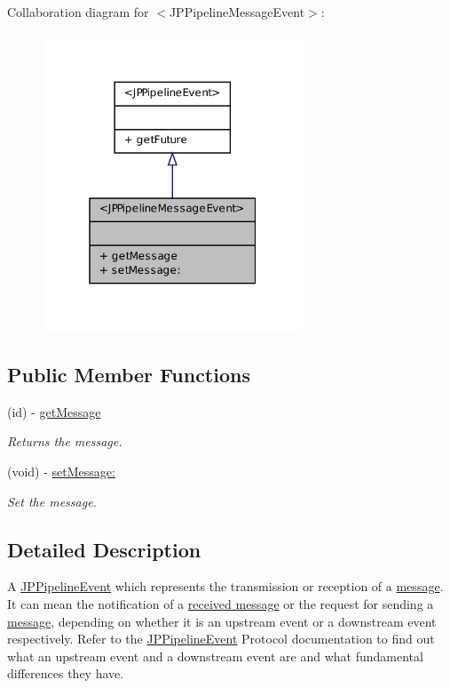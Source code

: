Collaboration diagram for $<$JPPipelineMessageEvent$>$:\nopagebreak
\begin{figure}[H]
\begin{center}
\leavevmode
\includegraphics[width=220pt]{a00144}
\end{center}
\end{figure}
\subsection*{Public Member Functions}
\begin{DoxyCompactItemize}
\item 
\hypertarget{a00031_abbb8960b1919e3c10b28399e6836ed7a}{
(id) -\/ \hyperlink{a00031_abbb8960b1919e3c10b28399e6836ed7a}{getMessage}}
\label{a00031_abbb8960b1919e3c10b28399e6836ed7a}

\begin{DoxyCompactList}\small\item\em Returns the message. \item\end{DoxyCompactList}\item 
(void) -\/ \hyperlink{a00031_acf338a1e97066129630e13538ca904c3}{setMessage:}
\begin{DoxyCompactList}\small\item\em Set the message. \item\end{DoxyCompactList}\end{DoxyCompactItemize}


\subsection{Detailed Description}
A \hyperlink{a00023}{JPPipelineEvent} which represents the transmission or reception of a \hyperlink{a00006}{message}. It can mean the notification of a \hyperlink{a00006}{received message} or the request for sending a \hyperlink{a00006}{message}, depending on whether it is an upstream event or a downstream event respectively. Refer to the \hyperlink{a00023}{JPPipelineEvent} Protocol documentation to find out what an upstream event and a downstream event are and what fundamental differences they have. 

